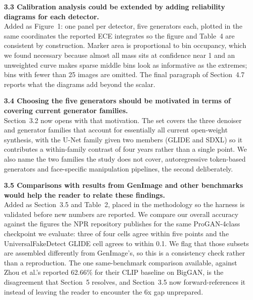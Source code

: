 \documentclass[11pt]{article}
\begin{document}
\noindent\textbf{3.3 Calibration analysis could be extended by adding
reliability diagrams for each detector.}\\[1pt]
Added as Figure~1: one panel per detector, five
generators each, plotted in the same coordinates the reported ECE
integrates so the figure and Table~4 are consistent by
construction. Marker area is proportional to bin occupancy, which we found
necessary because almost all mass sits at confidence near 1 and an
unweighted curve makes sparse middle bins look as informative as the
extremes; bins with fewer than 25 images are omitted. The final paragraph
of Section~4.7 reports what the diagrams add beyond the
scalar.

\noindent\textbf{3.4 Choosing the five generators should be motivated in
terms of covering current generator families.}\\[1pt]
Section~3.2 now opens with that motivation. The set
covers the three denoiser and generator families that account for
essentially all current open-weight synthesis, with the U-Net family given
two members (GLIDE and SDXL) so it contributes a within-family contrast of
four years rather than a single point. We also name the two families the
study does not cover, autoregressive token-based generators and
face-specific manipulation pipelines, the second deliberately.

\noindent\textbf{3.5 Comparisons with results from GenImage and other
benchmarks would help the reader to relate these findings.}\\[1pt]
Added as Section~3.5 and Table~2,
placed in the methodology so the harness is validated before new numbers
are reported. We compare our overall accuracy against the figures the NPR
repository publishes for the same ProGAN-4class checkpoint we evaluate:
three of four cells agree within five points and the UniversalFakeDetect
GLIDE cell agrees to within 0.1. We flag that those subsets are assembled
differently from GenImage's, so this is a consistency check rather than a
reproduction. The one same-benchmark comparison available, against Zhou et
al.'s reported 62.66\% for their CLIP baseline on BigGAN, is the
disagreement that Section~5 resolves, and
Section~3.5 now forward-references it instead of
leaving the reader to encounter the 6x gap unprepared.
\end{document}
